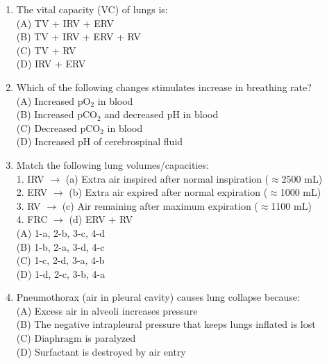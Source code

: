 \documentclass{article}
\begin{document}
\begin{enumerate}[label=Q\arabic*.]
\item The vital capacity (VC) of lungs is:
\\(A) TV + IRV + ERV
\\(B) TV + IRV + ERV + RV
\\(C) TV + RV
\\(D) IRV + ERV

\item Which of the following changes stimulates increase in breathing rate?
\\(A) Increased pO$_2$ in blood
\\(B) Increased pCO$_2$ and decreased pH in blood
\\(C) Decreased pCO$_2$ in blood
\\(D) Increased pH of cerebrospinal fluid

\item Match the following lung volumes/capacities:\\
1. IRV $\rightarrow$ (a) Extra air inspired after normal inspiration ($\approx$2500 mL)\\
2. ERV $\rightarrow$ (b) Extra air expired after normal expiration ($\approx$1000 mL)\\
3. RV $\rightarrow$ (c) Air remaining after maximum expiration ($\approx$1100 mL)\\
4. FRC $\rightarrow$ (d) ERV + RV
\\(A) 1-a, 2-b, 3-c, 4-d
\\(B) 1-b, 2-a, 3-d, 4-c
\\(C) 1-c, 2-d, 3-a, 4-b
\\(D) 1-d, 2-c, 3-b, 4-a

\item Pneumothorax (air in pleural cavity) causes lung collapse because:
\\(A) Excess air in alveoli increases pressure
\\(B) The negative intrapleural pressure that keeps lungs inflated is lost
\\(C) Diaphragm is paralyzed
\\(D) Surfactant is destroyed by air entry

\end{enumerate}
\end{document}

